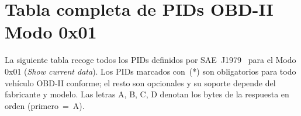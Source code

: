 \chapter{Tabla completa de PIDs OBD-II Modo 0x01}
\label{anx:obd2_pids_full}

La siguiente tabla recoge todos los PIDs definidos por SAE~J1979~\cite{SAEJ1979:2014} para el Modo 0x01 (\textit{Show current data}). Los PIDs marcados con~(*) son obligatorios para todo vehículo OBD-II conforme; el resto son opcionales y su soporte depende del fabricante y modelo. Las letras A, B, C, D denotan los bytes de la respuesta en orden (primero~=~A).

